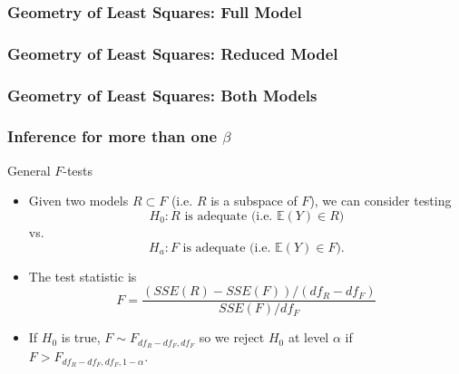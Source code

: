 \documentclass[handout]{beamer}
\begin{document}

   \begin{frame} \frametitle{Geometry of Least Squares: Full Model}

   \end{frame}


   \begin{frame} \frametitle{Geometry of Least Squares: Reduced Model}

   \end{frame}


   \begin{frame} \frametitle{Geometry of Least Squares: Both Models}

   \end{frame}


   \begin{frame} \frametitle{Inference for more than one $\beta$}

   \begin{block}
   { General   $F$-tests}
   \begin{itemize}
   \item Given two models $R \subset F$ (i.e. $R$ is a subspace of $F$),
   we can consider testing
   $$
   H_0: \text{$R$ is adequate (i.e. $\mathbb{E}(Y) \in R$)}$$
   vs.
   $$
   H_a: \text{$F$ is adequate (i.e. $\mathbb{E}(Y) \in F$)}.$$

   \item The test statistic is
   $$
   F = \frac{(SSE(R) - SSE(F)) / (df_R - df_F)}{SSE(F)/df_F}$$

   \item If $H_0$ is true, $F \sim F_{df_R-df_F, df_F}$ so we reject
   $H_0$ at level $\alpha$ if  $F > F_{df_R-df_F, df_F, 1-\alpha}$.
   \end{itemize}
   \end{block}
   \end{frame}

\end{document}
